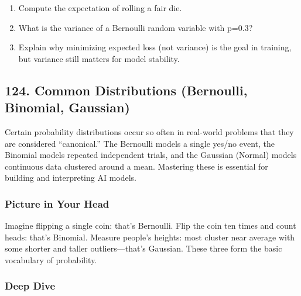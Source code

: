 \documentclass[
  letterpaper,
  DIV=11,
  numbers=noendperiod]{scrreprt}
\providecommand{\tightlist}{%
  \setlength{\itemsep}{0pt}\setlength{\parskip}{0pt}}
\begin{document}
\begin{enumerate}
\def\labelenumi{\arabic{enumi}.}
\tightlist
\item
  Compute the expectation of rolling a fair die.
\item
  What is the variance of a Bernoulli random variable with p=0.3?
\item
  Explain why minimizing expected loss (not variance) is the goal in
  training, but variance still matters for model stability.
\end{enumerate}

\subsection{124. Common Distributions (Bernoulli, Binomial,
Gaussian)}\label{common-distributions-bernoulli-binomial-gaussian}

Certain probability distributions occur so often in real-world problems
that they are considered ``canonical.'' The Bernoulli models a single
yes/no event, the Binomial models repeated independent trials, and the
Gaussian (Normal) models continuous data clustered around a mean.
Mastering these is essential for building and interpreting AI models.

\subsubsection{Picture in Your Head}\label{picture-in-your-head-123}

Imagine flipping a single coin: that's Bernoulli. Flip the coin ten
times and count heads: that's Binomial. Measure people's heights: most
cluster near average with some shorter and taller outliers---that's
Gaussian. These three form the basic vocabulary of probability.

\subsubsection{Deep Dive}\label{deep-dive-123}
\end{document}
